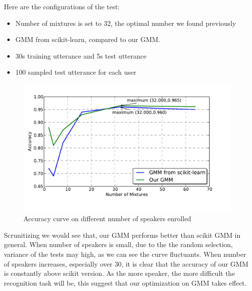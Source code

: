 Here are the configurations of the test:
\begin{itemize}
	\item Number of mixtures is set to 32, the optimal number we found previously
	\item GMM from scikit-learn, compared to our GMM.
	\item 30s training utterance and 5s test utterance
	\item 100 sampled test utterance for each user
\end{itemize}

\begin{figure}[!ht]
	\label{fig:nspk_enrolled}
	\centering
	\includegraphics[width=\linewidth]{res/mixture-both.pdf}
	\caption{Accuracy curve on different number of speakers enrolled}
\end{figure}

Scrunitizing  we would see that, our GMM performs better than
scikit GMM in general. When number of speakers is small, due to the the random
selection, variance of the tests may high, as we can see the curve fluctuants.
When number of speakers increases, especially over 30, it is clear that the
accuracy of our GMM is constantly above scikit version. As the more speaker,
the more difficult the recognition task will be, this suggest that our
optimization on GMM takes effect.


